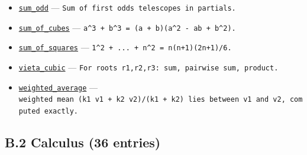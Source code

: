 \documentclass[
  10pt,
]{article}
\begin{document}
\begin{itemize}
  --- \texttt{sum\ k\^{}4\ =\ n(n+1)(2n+1)(3n\^{}2+3n-1)/30.}
\item
  \href{../generation_1/I1/algos_gen1_big.py}{\texttt{sum\_odd}} ---
  \texttt{Sum\ of\ first\ odds\ telescopes\ in\ partials.}
\item
  \href{../tools/prm/algos.py}{\texttt{sum\_of\_cubes}} ---
  \texttt{a\^{}3\ +\ b\^{}3\ =\ (a\ +\ b)(a\^{}2\ -\ ab\ +\ b\^{}2).}
\item
  \href{../generation_1/I1/algos_gen1_ext.py}{\texttt{sum\_of\_squares}}
  --- \texttt{1\^{}2\ +\ ...\ +\ n\^{}2\ =\ n(n+1)(2n+1)/6.}
\item
  \href{../generation_1/I1/algos_gen1_ext.py}{\texttt{vieta\_cubic}} ---
  \texttt{For\ roots\ r1,r2,r3:\ sum,\ pairwise\ sum,\ product.}
\item
  \href{../generation_1/I3/algos_i3.py}{\texttt{weighted\_average}} ---
  \texttt{weighted\ mean\ (k1\ v1\ +\ k2\ v2)/(k1\ +\ k2)\ lies\ between\ v1\ and\ v2,\ computed\ exactly.}
\end{itemize}

\subsection{B.2 Calculus (36 entries)}\label{b.2-calculus-36-entries}
\end{document}
